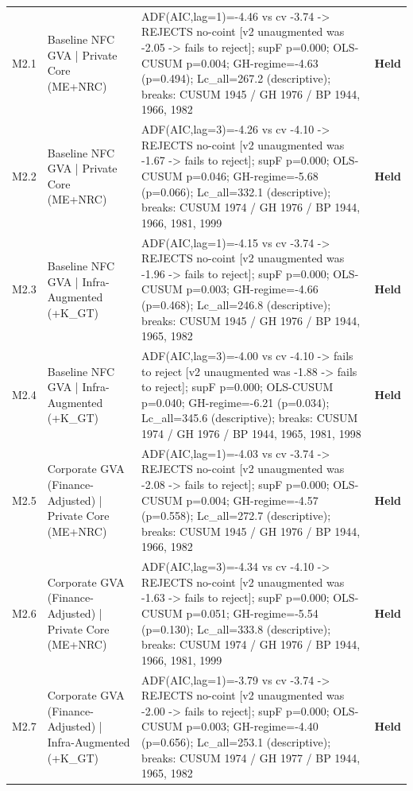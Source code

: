 \documentclass[11pt,a4paper]{article}
\begin{document}
\begin{longtable}{p{1.1cm}p{3.2cm}p{7.6cm}p{1.4cm}}
\addlinespace
M2.1 & Baseline NFC GVA | Private Core (ME+NRC) & ADF(AIC,lag=1)=-4.46 vs cv -3.74 -> REJECTS no-coint [v2 unaugmented was -2.05 -> fails to reject]; supF p=0.000; OLS-CUSUM p=0.004; GH-regime=-4.63 (p=0.494); Lc\_all=267.2 (descriptive); breaks: CUSUM 1945 / GH 1976 / BP 1944, 1966, 1982 & \textbf{Held} \\
\addlinespace
M2.2 & Baseline NFC GVA | Private Core (ME+NRC) & ADF(AIC,lag=3)=-4.26 vs cv -4.10 -> REJECTS no-coint [v2 unaugmented was -1.67 -> fails to reject]; supF p=0.000; OLS-CUSUM p=0.046; GH-regime=-5.68 (p=0.066); Lc\_all=332.1 (descriptive); breaks: CUSUM 1974 / GH 1976 / BP 1944, 1966, 1981, 1999 & \textbf{Held} \\
\addlinespace
M2.3 & Baseline NFC GVA | Infra-Augmented (+K\_GT) & ADF(AIC,lag=1)=-4.15 vs cv -3.74 -> REJECTS no-coint [v2 unaugmented was -1.96 -> fails to reject]; supF p=0.000; OLS-CUSUM p=0.003; GH-regime=-4.66 (p=0.468); Lc\_all=246.8 (descriptive); breaks: CUSUM 1945 / GH 1976 / BP 1944, 1965, 1982 & \textbf{Held} \\
\addlinespace
M2.4 & Baseline NFC GVA | Infra-Augmented (+K\_GT) & ADF(AIC,lag=3)=-4.00 vs cv -4.10 -> fails to reject [v2 unaugmented was -1.88 -> fails to reject]; supF p=0.000; OLS-CUSUM p=0.040; GH-regime=-6.21 (p=0.034); Lc\_all=345.6 (descriptive); breaks: CUSUM 1974 / GH 1976 / BP 1944, 1965, 1981, 1998 & \textbf{Held} \\
\addlinespace
M2.5 & Corporate GVA (Finance-Adjusted) | Private Core (ME+NRC) & ADF(AIC,lag=1)=-4.03 vs cv -3.74 -> REJECTS no-coint [v2 unaugmented was -2.08 -> fails to reject]; supF p=0.000; OLS-CUSUM p=0.004; GH-regime=-4.57 (p=0.558); Lc\_all=272.7 (descriptive); breaks: CUSUM 1945 / GH 1976 / BP 1944, 1966, 1982 & \textbf{Held} \\
\addlinespace
M2.6 & Corporate GVA (Finance-Adjusted) | Private Core (ME+NRC) & ADF(AIC,lag=3)=-4.34 vs cv -4.10 -> REJECTS no-coint [v2 unaugmented was -1.63 -> fails to reject]; supF p=0.000; OLS-CUSUM p=0.051; GH-regime=-5.54 (p=0.130); Lc\_all=333.8 (descriptive); breaks: CUSUM 1974 / GH 1976 / BP 1944, 1966, 1981, 1999 & \textbf{Held} \\
\addlinespace
M2.7 & Corporate GVA (Finance-Adjusted) | Infra-Augmented (+K\_GT) & ADF(AIC,lag=1)=-3.79 vs cv -3.74 -> REJECTS no-coint [v2 unaugmented was -2.00 -> fails to reject]; supF p=0.000; OLS-CUSUM p=0.003; GH-regime=-4.40 (p=0.656); Lc\_all=253.1 (descriptive); breaks: CUSUM 1974 / GH 1977 / BP 1944, 1965, 1982 & \textbf{Held} \\

\end{longtable}
\end{document}
